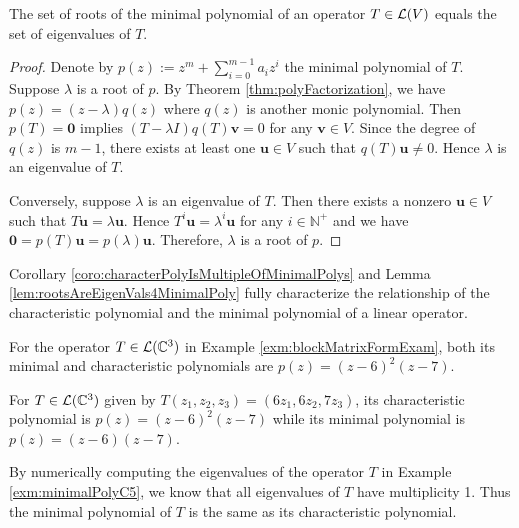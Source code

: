 \begin{lem}
  \label{lem:rootsAreEigenVals4MinimalPoly}
  The set of roots of the minimal polynomial
  of an operator $T\in{\cal L}(V)$
  equals the set of eigenvalues of $T$.
\end{lem}
\begin{proof}
  Denote by $p(z):=z^m+\sum_{i=0}^{m-1}a_i z^i$ the minimal
  polynomial of $T$.
  Suppose $\lambda$ is a root of $p$.
  By Theorem \ref{thm:polyFactorization}, 
  we have $p(z)=(z-\lambda)q(z)$ where $q(z)$
  is another monic polynomial.
  Then $p(T)=\mathbf{0}$ implies
  $(T-\lambda I)q(T)\mathbf{v}=0$
  for any $\mathbf{v}\in V$.
  Since the degree of $q(z)$ is $m-1$,
  there exists at least one $\mathbf{u}\in V$
  such that $q(T)\mathbf{u}\ne 0$.
  Hence $\lambda$ is an eigenvalue of $T$.

  Conversely, suppose $\lambda$ is an eigenvalue of $T$.
  Then there exists a nonzero $\mathbf{u}\in V$
  such that $T\mathbf{u} = \lambda \mathbf{u}$. 
  Hence $T^i\mathbf{u} = \lambda^i \mathbf{u}$
  for any $i\in\mathbb{N}^+$
  and we have $\mathbf{0}=p(T)\mathbf{u} = p(\lambda)\mathbf{u}$.
  Therefore, $\lambda$ is a root of $p$. 
\end{proof}

\begin{rem}
  Corollary \ref{coro:characterPolyIsMultipleOfMinimalPolys}
  and Lemma \ref{lem:rootsAreEigenVals4MinimalPoly}
  fully characterize the relationship
  of the characteristic polynomial
  and the minimal polynomial of a linear operator.
\end{rem}

\begin{exm}
  For the operator $T\in {\cal L}(\mathbb{C}^3)$
  in Example \ref{exm:blockMatrixFormExam}, 
  both its minimal 
  and characteristic polynomials
  are $p(z)=(z-6)^2(z-7)$.
\end{exm}

\begin{exm}
  For $T\in {\cal L}(\mathbb{C}^3)$
  given by $T(z_1,z_2,z_3)=(6z_1, 6z_2, 7z_3)$,
  its characteristic polynomial is $p(z)=(z-6)^2(z-7)$
  while its minimal polynomial is $p(z)=(z-6)(z-7)$.
\end{exm}

\begin{exm}
  \label{exm:minimalPoly5Eigenvals}
  By numerically computing the eigenvalues
  of the operator $T$ in Example \ref{exm:minimalPolyC5}, 
  we know that all eigenvalues of $T$ have multiplicity 1.
  Thus the minimal polynomial of $T$
  is the same as its characteristic polynomial.
\end{exm}

